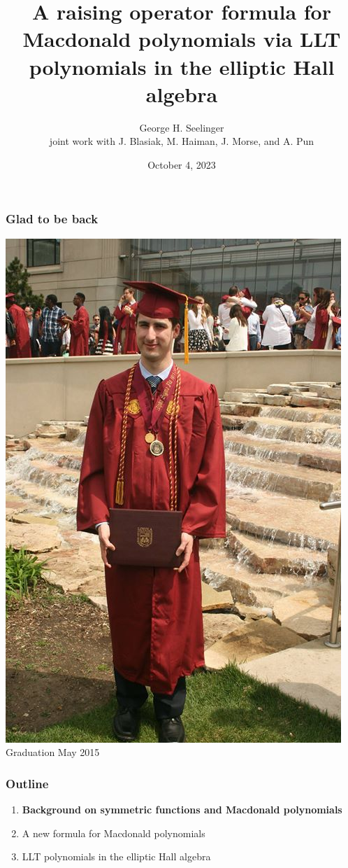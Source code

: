 \documentclass[dvipsnames]{beamer}
\title[Macdonald Catalanimals]{A raising operator formula for
  Macdonald polynomials via LLT polynomials in the elliptic Hall algebra} %
\author[George H. Seelinger]{George H. Seelinger \\ joint work with
  J. Blasiak, M. Haiman, J. Morse, and A. Pun} %
\institute[UMich] %
{
ghseeli@umich.edu\\ %
\medskip
Loyola University Chicago TACO Seminar\\ %
\medskip
Based on arXiv:2112.07063 and arXiv:2307.06517
}
\date{October 4, 2023} %
\theoremstyle{definition}
\begin{document}
\begin{frame}
\titlepage %
\end{frame}
\begin{frame}
  \frametitle{Glad to be back}
  \begin{center}
    \includegraphics[scale=0.25]{./images/Loyola graduation 2015.jpg}\\
    
    Graduation May 2015
  \end{center}
\end{frame}
\begin{frame}
  \frametitle{Outline}
  \begin{enumerate}
  \item {\bf Background on symmetric functions and Macdonald polynomials}
  \item A new formula for Macdonald polynomials
  \item LLT polynomials in the elliptic Hall algebra
  \end{enumerate}
\end{frame}
\end{document}
